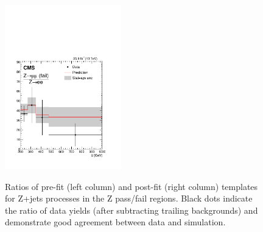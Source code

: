 \begin{figure}
\includegraphics[width=0.45\textwidth]{figures/pullsImpact/ratio_zmm_fail_zee_shapes_fit_b.pdf}\\
\caption{Ratios of pre-fit (left column) and post-fit (right column) templates for Z+jets processes in the Z pass/fail regions. Black dots indicate the ratio of data yields (after subtracting trailing backgrounds) and demonstrate good agreement between data and simulation.}
\label{wwratios}
\end{figure}
